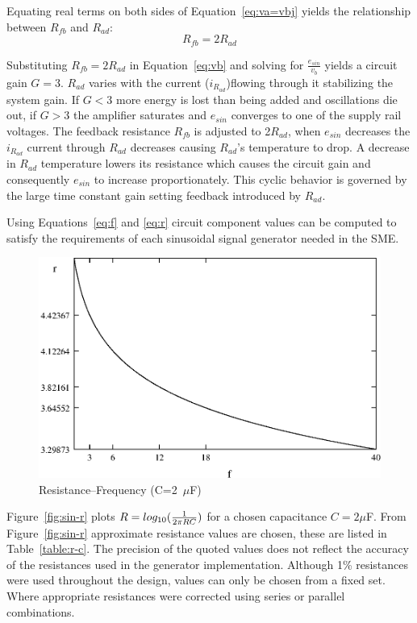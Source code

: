 Equating real terms on both sides of Equation~\ref{eq:va=vbj} yields
the relationship between $R_{fb}$ and $R_{ad}$:
\begin{equation}
	R_{fb} = 2R_{ad}
	\label{eq:r}
\end{equation}

Substituting $R_{fb} = 2R_{ad}$ in Equation~\ref{eq:vb} and solving
for $\frac{e_{sin}}{v_b}$ yields a circuit gain $G = 3$. $R_{ad}$
varies with the current ($i_{R_{ad}}$)flowing through it stabilizing
the system gain. If $G < 3$ more energy is lost than being added and
oscillations die out, if $G > 3$ the amplifier saturates and $e_{sin}$
converges to one of the supply rail voltages. The feedback resistance
$R_{fb}$ is adjusted to 2$R_{ad}$, when $e_{sin}$ decreases the
$i_{R_{ad}}$ current through $R_{ad}$ decreases causing $R_{ad}$'s
temperature to drop. A decrease in $R_{ad}$ temperature lowers its
resistance which causes the circuit gain and consequently $e_{sin}$ to
increase proportionately. This cyclic behavior is governed by the
large time constant gain setting feedback introduced by $R_{ad}$.

Using Equations~\ref{eq:f} and \ref{eq:r} circuit component values can
be computed to satisfy the requirements of each sinusoidal signal
generator needed in the SME.

\begin{figure}[htbp]
	\begin{center}
	\includegraphics[width=\textwidth]{sin-r.eps}
    \caption{Resistance--Frequency (C=2~$\mu$F)}
    \label{fig:sin-r}
	\end{center}
\end{figure}

Figure~\vref{fig:sin-r} plots $R = log_{10}(\frac{1}{2\pi\/RC})$ for a
chosen capacitance $C = 2\mu$F. From Figure~\vref{fig:sin-r}
approximate resistance values are chosen, these are listed in
Table~\vref{table:r-c}. The precision of the quoted values does not
reflect the accuracy of the resistances used in the generator
implementation. Although 1\% resistances were used throughout the
design, values can only be chosen from a fixed set. Where appropriate
resistances were corrected using series or parallel combinations.


